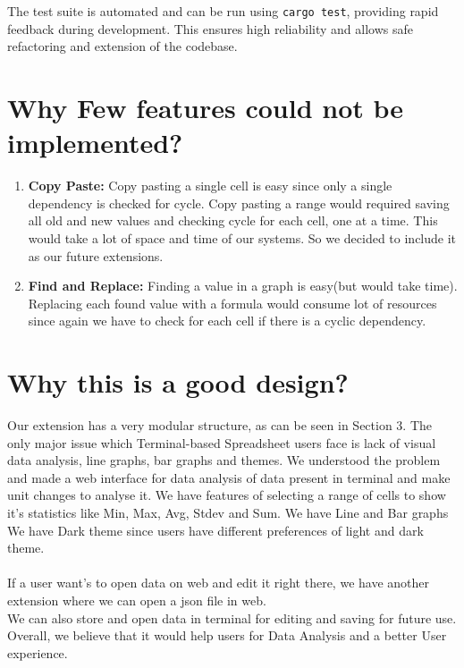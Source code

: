 \documentclass{article}
\begin{document}
\noindent
The test suite is automated and can be run using \texttt{cargo test}, providing rapid feedback during development. This ensures high reliability and allows safe refactoring and extension of the codebase.

\section{Why Few features could not be implemented?}
\begin{enumerate}
    \item \textbf{Copy Paste:} Copy pasting a single cell is easy since only a single dependency is checked for cycle. Copy pasting a range would required saving all old and new values and checking cycle for each cell, one at a time. This would take a lot of space and time of our systems. So we decided to include it as our future extensions.
    \item \textbf{Find and Replace:} Finding a value in a graph is easy(but would take time). Replacing each found value with a formula would consume lot of resources since again we have to check for each cell if there is a cyclic dependency.
\end{enumerate}

\section{Why this is a good design?}
Our extension has a very modular structure, as can be seen in Section 3. The only major issue which Terminal-based Spreadsheet users face is lack of visual data analysis, line graphs, bar graphs and themes.
We understood the problem and made a web interface for data analysis of data present in terminal and make unit changes to analyse it. We have features of selecting a range of cells to show it's statistics like Min, Max, Avg, Stdev and Sum.
We have Line and Bar graphs
We have Dark theme since users have different preferences of light and dark theme.\\ \\ If a user want's to open data on web and edit it right there, we have another extension where we can open a json file in web. \\
We can also store and open data in terminal for editing and saving for future use. Overall, we believe that it would help users for Data Analysis and a better User experience.
\end{document}
